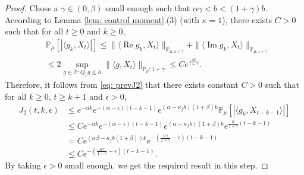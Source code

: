 \documentclass[12pt,a4paper]{amsart}
\theoremstyle{plain}
\theoremstyle{definition}
\numberwithin{equation}{section}
\begin{document}
\begin{proof}
    Chose a $\gamma\in(0,\beta)$ small enough such that $\alpha \gamma < b < (1+\gamma)b$.
    According to Lemma \ref{lem: control moment}.(3) (with $\kappa=1$), there exists $C>0$ such that for all $t\geq 0$ and $k\geq 0$,
\begin{equation}\begin{split}
    &\mathbb{P}_{\mu}\left[\left|\langle g_k,X_{t}\rangle\right|\right]
    \leq \|\langle \operatorname{Re} g_k, X_{t}\rangle\|_{\mathbb{P}_{\mu,1+\gamma}} + \|\langle \operatorname{Im} g_k, X_{t}\rangle\|_{\mathbb{P}_{\mu,1+\gamma}}
    \\& \leq 2\sup_{g\in \mathcal P: Q_1 g\leq h} \|\langle g, X_t\rangle\|_{\mathbb P_\mu; 1+\gamma} \leq C e^{\frac{\alpha t}{1+\gamma}}.
\end{split}\end{equation}
Therefore, it follows from \eqref{eq: prevJ2} that
there exists constant $C>0$ such that for all $k\geq 0$, $t\geq k+1$ and $\epsilon> 0$,
\begin{equation}\begin{split}
\label{eq: right bound for J2}
    J_2(t,k, \epsilon)&
\leq  e^{-\alpha k}e^{-(\alpha-\epsilon)(t-k-1)}e^{(\alpha-\kappa_f b)(1+\beta)k} \mathbb{P}_{\mu}\left[\left|\langle g_k,X_{t-k-1}\rangle\right|\right]
    \\&\leq C e^{-\alpha k}e^{-(\alpha-\epsilon)(t-k-1)}e^{(\alpha-\kappa_f b)(1+\beta)k} e^{\frac{\alpha}{1+\gamma}(t-k-1)}
    \\&= C e^{(\alpha \beta - \kappa_f b(1+\beta))k}e^{-(\frac{\alpha\gamma}{1+\gamma}-\epsilon)(t-k-1)}
    \\&\leq C e^{-(\frac{\alpha\gamma}{1+\gamma}-\epsilon)(t-k-1)}.
\end{split}\end{equation}
    By taking $\epsilon >0$ small enough, we get the required result in this step.


\end{proof}
\end{document}
